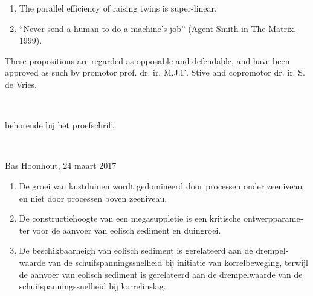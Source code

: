 \documentclass[headinclude,footinclude,cleardoublepage=empty,
numbers=noenddot,fontsize=9pt]{scrbook}
\begin{document}
\begin{titlepage}
\begin{enumerate}
  \item The parallel efficiency of raising twins is super-linear.
    
  \item ``Never send a human to do a machine's job'' (Agent Smith in
    The Matrix, 1999).

  \end{enumerate}

  \vfill

  \noindent These propositions are regarded as opposable and
  defendable, and have been approved as such by promotor
  prof. dr. ir. M.J.F. Stive and copromotor dr. ir. S. de Vries.

  \newpage

  \begin{otherlanguage}{dutch}
    \thispagestyle{empty}

    \begin{center}
      \hfill
      \vfill
    
      \begingroup
      \color{Maroon} \\ \bigskip
      \endgroup
      
      behorende bij het proefschrift \\ \bigskip
      
      \begingroup
      \color{Maroon} \\ \bigskip
      \endgroup
      
      Bas Hoonhout, 24 maart 2017
    \end{center}  
    
    \vfill
    
    \begin{enumerate}
      
    \item De groei van kustduinen wordt gedomineerd door processen
      onder zeeniveau en niet door processen boven zeeniveau.
      
    \item De constructiehoogte van een megasuppletie is een kritische
      ontwerpparameter voor de aanvoer van eolisch sediment en
      duingroei.
      
    \item De beschikbaarheigh van eolisch sediment is gerelateerd aan
      de drempelwaarde van de schuifspanningssnelheid bij initiatie
      van korrelbeweging, terwijl de aanvoer van eolisch sediment is
      gerelateerd aan de drempelwaarde van de schuifspanningssnelheid
      bij korrelinslag.
      

\end{enumerate}
\end{otherlanguage}
\end{titlepage}
\end{document}

